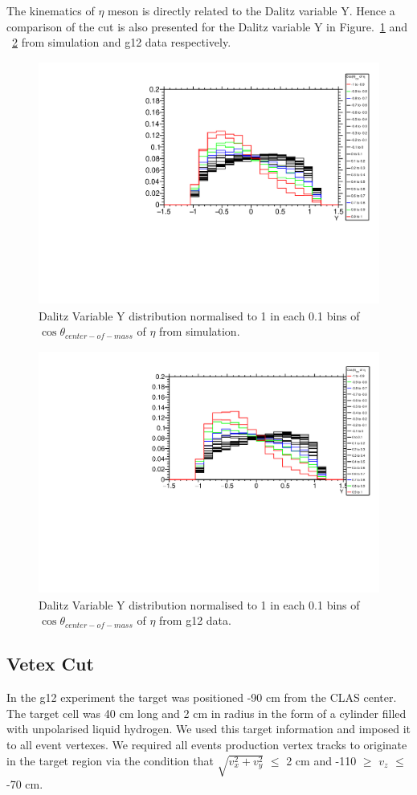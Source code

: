 The kinematics of $\eta$ meson is directly related to the Dalitz variable Y. Hence a comparison of the cut is also presented for the Dalitz variable Y in Figure.~\ref{Fig_CsE_3} and  ~\ref{Fig_CsE_4} from simulation and g12 data respectively.    

\begin{figure}[ht!]
\centerline{
\includegraphics[width=12cm,height=8cm]{eta_CosTh_Cut.pdf}}
\caption{Dalitz Variable Y distribution normalised to 1 in each 0.1 bins of $\cos\theta_{center-of-mass}$ of $\eta$ from simulation.}
\label{Fig_CsE_3}
\end{figure}

\begin{figure}[ht!]
\centerline{
\includegraphics[width=12cm,height=8cm]{sim_CsEta.pdf}}
\caption{Dalitz Variable Y distribution normalised to 1 in each 0.1 bins of $\cos\theta_{center-of-mass}$ of $\eta$ from g12 data.}
\label{Fig_CsE_4}
\end{figure}
\FloatBarrier
\subsection{Vetex Cut}
\label{VCut}
In the g12 experiment the target was positioned -90 cm from the CLAS center. The target cell was 40 cm long and 2 cm in radius in the form of a cylinder filled with unpolarised liquid hydrogen. We used this target information and imposed it to all event vertexes. We required all events  production vertex tracks to originate in the target region via the condition that $\sqrt{v_{x}^{2} + v_{y}^{2}}$ $\leq$ 2 cm and -110 $\geq$ $v_{z}$ $\leq$ -70 cm. 


